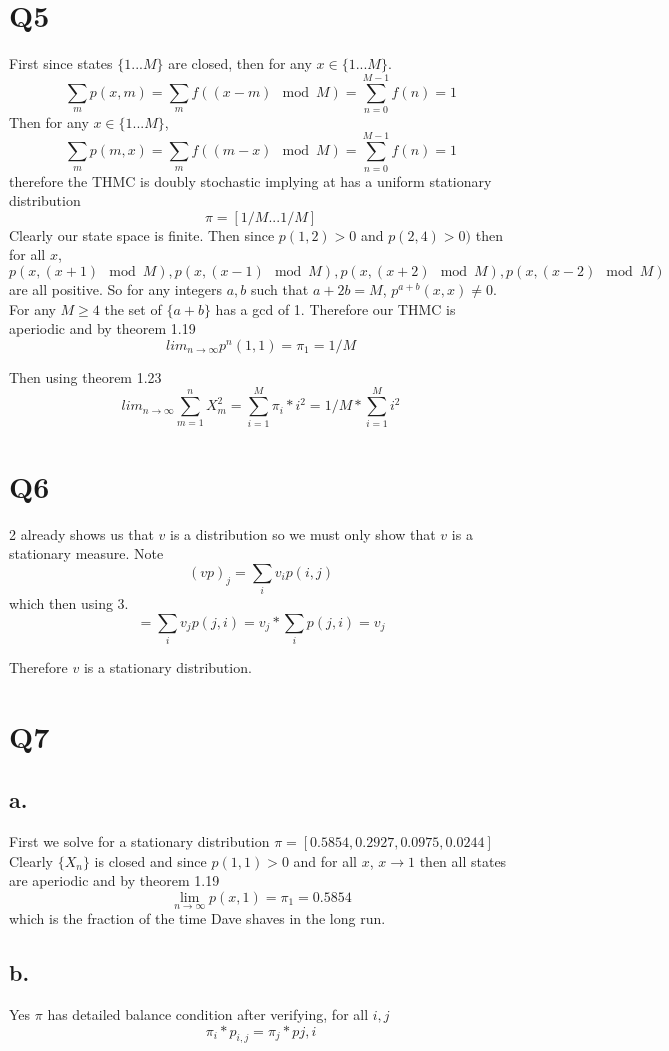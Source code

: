 \documentclass{article}
\begin{document}
\section*{Q5}
First since states $\{1 ... M \}$ are closed, then for any $x \in \{1 ... M\}$. 
\[
\sum_m p(x,m) = \sum_m f((x-m) \mod M) = \sum_{n = 0}^{M-1} f(n) = 1
\]
Then for any $x \in \{1 ... M\}$,
\[
\sum_m p(m,x) = \sum_m f((m-x) \mod M) = \sum_{n = 0}^{M-1} f(n) = 1
\]
therefore the THMC is doubly stochastic implying at has a uniform stationary distribution
\[
\pi = [1/M ... 1/M]
\]
Clearly our state space is finite. Then since $p(1,2) > 0$ and $p(2,4) > 0)$
then for all $x$, $p(x,(x+1) \mod M) , p(x, (x-1) \mod M), p(x, (x+2) \mod M) ,  p(x, (x-2) \mod M)$ are all positive. So for any integers $a,b$ such that $a + 2b = M$, $p^{a+b}(x,x) \neq 0$. For any $M \geq 4$ the set of $\{a+b\}$ has a gcd of 1. Therefore our THMC is aperiodic and by theorem 1.19
\[
lim_{n \to \infty} p^n(1,1) = \pi_1 = 1/M
\]

Then using theorem 1.23
\[
lim_{n \to \infty} \sum_{m = 1}^n X_m^2 = \sum_{i= 1} ^M \pi_i * i^2 = 1/M * \sum_{i = 1}^M i^2
\]

\section*{Q6}
2 already shows us that $v$ is a distribution so we must only show that $v$ is a stationary measure. 
Note
\[
(v p)_j = \sum_i v_ip(i,j)   
\]
which then using 3.
\[
 = \sum_i v_jp(j,i) = v_j * \sum_i p(j,i) = v_j
\]

Therefore $v$ is a stationary distribution.

\section*{Q7}
\subsection*{a.}
First we solve for a stationary distribution
$
\pi = [ 0.5854,  0.2927,  0.0975,  0.0244]
$
Clearly $\{X_n\}$ is closed and since $p(1,1) > 0$ and for all $x$, $x \rightarrow 1$ then all states are aperiodic and by theorem 1.19 
\[
\lim_{n \to \infty} p(x,1) = \pi_1 = 0.5854
\]
which is the fraction of the time Dave shaves in the long run.

\subsection*{b.}
Yes $\pi$ has detailed balance condition after verifying,
for all $i,j$
\[
\pi_i*p_{i,j} = \pi_j*p{j,i}
\]
\end{document}
